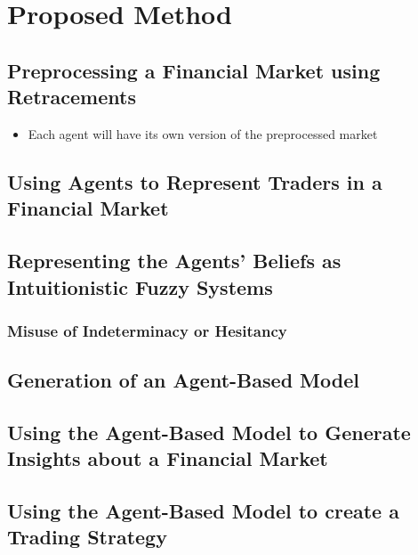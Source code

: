 \chapter{Proposed Method}
\label{chapter:proposed-method}

\section{Preprocessing a Financial Market using Retracements}
\label{section:preprocessing-a-financial-market-using-retracements}

\begin{itemize}
\item Each agent will have its own version of the preprocessed market
\end{itemize}

\section{Using Agents to Represent Traders in a Financial Market}
\label{section:using-agents-to-represent-traders-in-a-financial-market}

\section{Representing the Agents' Beliefs as Intuitionistic Fuzzy Systems}
\label{section:representing-the-agents-beliefs-as-intuitionistic-fuzzy-systems}

\subsection{Misuse of Indeterminacy or Hesitancy}
\label{subsection:misuse-of-indeterminacy-or-hesitancy}

\section{Generation of an Agent-Based Model}
\label{section:generation-of-an-agent-based-model}

\section{Using the Agent-Based Model to Generate Insights about a Financial
Market}
\label{section:using-the-agent-based-model-to-generate-insights-about-a-financial-market}

\section{Using the Agent-Based Model to create a Trading Strategy}
\label{section:using-the-agent-based-model-to-create-a-trading-strategy}